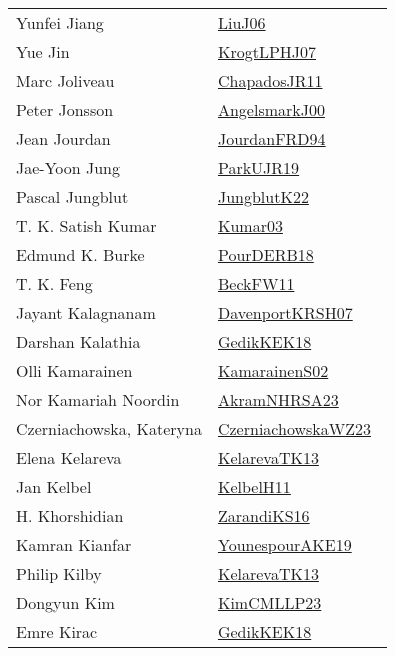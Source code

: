 {\begin{longtable}{p{4cm}p{20cm}}
Yunfei Jiang & \href{works/LiuJ06.pdf}{LiuJ06}~\cite{LiuJ06}\\
Yue Jin & \href{works/KrogtLPHJ07.pdf}{KrogtLPHJ07}~\cite{KrogtLPHJ07}\\
Marc Joliveau & \href{works/ChapadosJR11.pdf}{ChapadosJR11}~\cite{ChapadosJR11}\\
Peter Jonsson & \href{works/AngelsmarkJ00.pdf}{AngelsmarkJ00}~\cite{AngelsmarkJ00}\\
Jean Jourdan & \href{}{JourdanFRD94}~\cite{JourdanFRD94}\\
Jae{-}Yoon Jung & \href{works/ParkUJR19.pdf}{ParkUJR19}~\cite{ParkUJR19}\\
Pascal Jungblut & \href{works/JungblutK22.pdf}{JungblutK22}~\cite{JungblutK22}\\
T. K. Satish Kumar & \href{works/Kumar03.pdf}{Kumar03}~\cite{Kumar03}\\
Edmund K. Burke & \href{works/PourDERB18.pdf}{PourDERB18}~\cite{PourDERB18}\\
T. K. Feng & \href{}{BeckFW11}~\cite{BeckFW11}\\
Jayant Kalagnanam & \href{works/DavenportKRSH07.pdf}{DavenportKRSH07}~\cite{DavenportKRSH07}\\
Darshan Kalathia & \href{works/GedikKEK18.pdf}{GedikKEK18}~\cite{GedikKEK18}\\
Olli Kamarainen & \href{works/KamarainenS02.pdf}{KamarainenS02}~\cite{KamarainenS02}\\
Nor Kamariah Noordin & \href{works/AkramNHRSA23.pdf}{AkramNHRSA23}~\cite{AkramNHRSA23}\\
Czerniachowska, Kateryna & \href{works/CzerniachowskaWZ23.pdf}{CzerniachowskaWZ23}~\cite{CzerniachowskaWZ23}\\
Elena Kelareva & \href{works/KelarevaTK13.pdf}{KelarevaTK13}~\cite{KelarevaTK13}\\
Jan Kelbel & \href{works/KelbelH11.pdf}{KelbelH11}~\cite{KelbelH11}\\
H. Khorshidian & \href{works/ZarandiKS16.pdf}{ZarandiKS16}~\cite{ZarandiKS16}\\
Kamran Kianfar & \href{works/YounespourAKE19.pdf}{YounespourAKE19}~\cite{YounespourAKE19}\\
Philip Kilby & \href{works/KelarevaTK13.pdf}{KelarevaTK13}~\cite{KelarevaTK13}\\
Dongyun Kim & \href{works/KimCMLLP23.pdf}{KimCMLLP23}~\cite{KimCMLLP23}\\
Emre Kirac & \href{works/GedikKEK18.pdf}{GedikKEK18}~\cite{GedikKEK18}\\

\end{longtable}}
